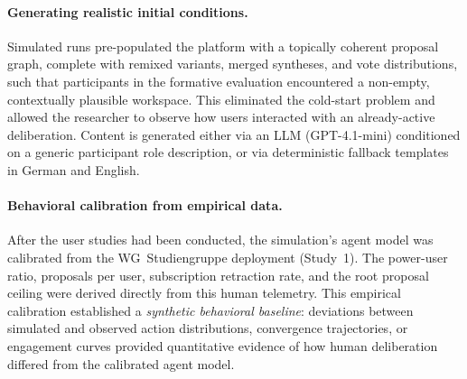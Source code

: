 \documentclass[a4paper, 12pt, twoside]{iviathesis}
\begin{document}
\paragraph{Generating realistic initial conditions.}
Simulated runs pre-populated the platform with a topically coherent proposal graph, complete with remixed variants, merged syntheses, and vote distributions, such that participants in the formative evaluation encountered a non-empty, contextually plausible workspace. This eliminated the cold-start problem and allowed the researcher to observe how users interacted with an already-active deliberation. Content is generated either via an LLM (GPT-4.1-mini) conditioned on a generic participant role description, or via deterministic fallback templates in German and English.

\paragraph{Behavioral calibration from empirical data.}
After the user studies had been conducted, the simulation's agent model was calibrated from the WG~Studiengruppe deployment (Study~1). The power-user ratio, proposals per user, subscription retraction rate, and the root proposal ceiling were derived directly from this human telemetry. This empirical calibration established a \textit{synthetic behavioral baseline}: deviations between simulated and observed action distributions, convergence trajectories, or engagement curves provided quantitative evidence of how human deliberation differed from the calibrated agent model.
\end{document}
